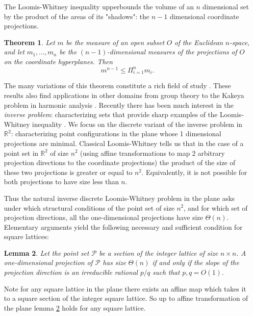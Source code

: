 \documentclass[11pt]{article}
\newtheorem{theorem}{Theorem}[section]
\newtheorem{lemma}[theorem]{Lemma}
\newcommand{\parag}[1]{\vspace{2mm}

\noindent{\bf #1} }
\newcommand{\RR}{\ensuremath{\mathbb R}}
\newcommand{\pts}{\mathcal P}
\begin{document}
\parag{Application to Inverse Discrete Loomis-Whitney.}

The Loomis-Whitney inequality \cite{LW} upperbounds the volume of an $n$ dimensional set by the product of the areas of its "shadows": the $n-1$ dimensional coordinate projections. 

\begin{theorem} \label{th:LoomisWhitney}
Let $m$ be the measure of an open subset $O$ of the Euclidean $n$-space, and let $m_1,...,m_n$ be the $(n-1)$-dimensional measures of the projections of $O$ on the coordinate hyperplanes. Then  
%
\[ m^{n-1} \leq \Pi_{i=1}^n m_i. \]
%
\end{theorem}

The many variations of this theorem constitute a rich field of study \cite{Ball,BT,BCW,Do20}. These results also find applications in other domains from group theory \cite{gromov} to the Kakeya problem in harmonic analysis \cite{BCT06}.
Recently there has been much interest in the \textit{inverse problem}: characterizing sets that provide sharp examples of the Loomis-Whitney inequality \cite{CGG18,AB21}.
We focus on the discrete variant of the inverse problem in $\RR^2$: characterizing point configurations in the plane whose 1 dimensional projections are minimal. Classical Loomis-Whitney tells us that in the case of a point set in $\RR^2$ of size $n^2$ (using affine transformations to map 2 arbitrary projection directions to the coordinate projections) the product of the size of these two projections is greater or equal to $n^2$. Equivalently, it is not possible for both projections to have size less than $n$. 

Thus the natural inverse discrete Loomis-Whitney problem in the plane asks under which structural conditions of the point set of size $n^2$, and for which set of projection directions, all the one-dimensional projections have size $\Theta(n)$. Elementary arguments yield the following necessary and sufficient condition for square lattices:

\begin{lemma}\label{th:LM_lattice}
Let the point set $\pts$ be a section of the integer lattice of size $n \times n$. A one-dimensional projection  of $\pts$ has size $\Theta(n)$ if and only if the slope of the projection direction is an irreducible rational $p/q$ such that $p,q=O(1)$.
\end{lemma}

Note for any square lattice in the plane there exists an affine map which takes it to a square section of the integer square lattice. So up to affine transformation of the plane lemma \ref{th:LM_lattice} holds for any square lattice.
\end{document}
